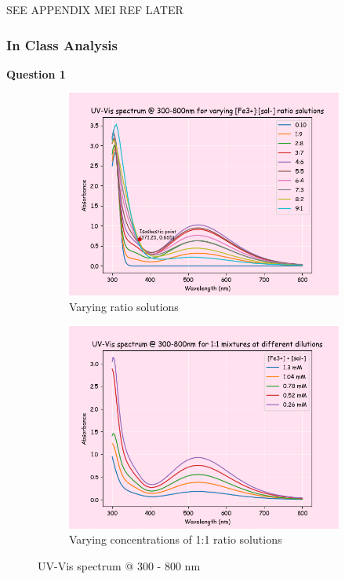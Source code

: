 SEE APPENDIX MEI REF LATER
\subsubsection*{In Class Analysis}
\textbf{Question 1}
\begin{figure}[H]
     \centering
     \begin{subfigure}[b]{0.49\textwidth}
         \centering
         \includegraphics[width=\textwidth]{part2_q1a.png}
         \caption{Varying ratio solutions}
         \label{fig:part2_q1_a}
     \end{subfigure}
     \hfill
     \begin{subfigure}[b]{0.49\textwidth}
         \centering
         \includegraphics[width=\textwidth]{part2_q1_b.png}
         \caption{Varying concentrations of 1:1 ratio solutions}
         \label{fig:part2_q1_b}
     \end{subfigure}
     \caption{UV-Vis spectrum @ 300 - 800 nm}
     \label{fig:part2q1}
\end{figure}

